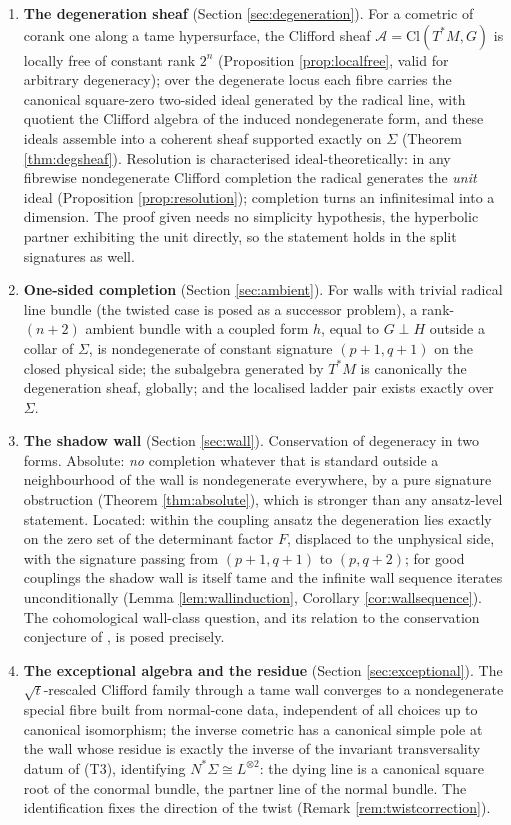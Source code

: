 \documentclass[11pt]{article}
\theoremstyle{definition}
\newcommand{\Cl}{\mathrm{Cl}}
\newcommand{\shA}{\mathcal{A}}
\newcommand{\shL}{L}
\newcommand{\Sig}{\Sigma}
\begin{document}
\begin{enumerate}
\item \textbf{The degeneration sheaf} (Section \ref{sec:degeneration}). For a cometric of corank one along a tame hypersurface, the Clifford sheaf $\shA = \Cl(T^*M, G)$ is locally free of constant rank $2^n$ (Proposition \ref{prop:localfree}, valid for arbitrary degeneracy); over the degenerate locus each fibre carries the canonical square-zero two-sided ideal generated by the radical line, with quotient the Clifford algebra of the induced nondegenerate form, and these ideals assemble into a coherent sheaf supported exactly on $\Sig$ (Theorem \ref{thm:degsheaf}). Resolution is characterised ideal-theoretically: in any fibrewise nondegenerate Clifford completion the radical generates the \emph{unit} ideal (Proposition \ref{prop:resolution}); completion turns an infinitesimal into a dimension. The proof given needs no simplicity hypothesis, the hyperbolic partner exhibiting the unit directly, so the statement holds in the split signatures as well.
\item \textbf{One-sided completion} (Section \ref{sec:ambient}). For walls with trivial radical line bundle (the twisted case is posed as a successor problem), a rank-$(n{+}2)$ ambient bundle with a coupled form $h$, equal to $G \perp H$ outside a collar of $\Sig$, is nondegenerate of constant signature $(p{+}1,q{+}1)$ on the closed physical side; the subalgebra generated by $T^*M$ is canonically the degeneration sheaf, globally; and the localised ladder pair exists exactly over $\Sig$.
\item \textbf{The shadow wall} (Section \ref{sec:wall}). Conservation of degeneracy in two forms. Absolute: \emph{no} completion whatever that is standard outside a neighbourhood of the wall is nondegenerate everywhere, by a pure signature obstruction (Theorem \ref{thm:absolute}), which is stronger than any ansatz-level statement. Located: within the coupling ansatz the degeneration lies exactly on the zero set of the determinant factor $F$, displaced to the unphysical side, with the signature passing from $(p{+}1,q{+}1)$ to $(p,q{+}2)$; for good couplings the shadow wall is itself tame and the infinite wall sequence iterates unconditionally (Lemma \ref{lem:wallinduction}, Corollary \ref{cor:wallsequence}). The cohomological wall-class question, and its relation to the conservation conjecture of \cite[\S7.4]{ButlerT1}, is posed precisely.
\item \textbf{The exceptional algebra and the residue} (Section \ref{sec:exceptional}). The $\sqrt{t}$-rescaled Clifford family through a tame wall converges to a nondegenerate special fibre built from normal-cone data, independent of all choices up to canonical isomorphism; the inverse cometric has a canonical simple pole at the wall whose residue is exactly the inverse of the invariant transversality datum of (T3), identifying $N^*\Sig \cong \shL^{\otimes 2}$: the dying line is a canonical square root of the conormal bundle, the partner line of the normal bundle. The identification fixes the direction of the twist (Remark \ref{rem:twistcorrection}).

\end{enumerate}
\end{document}
